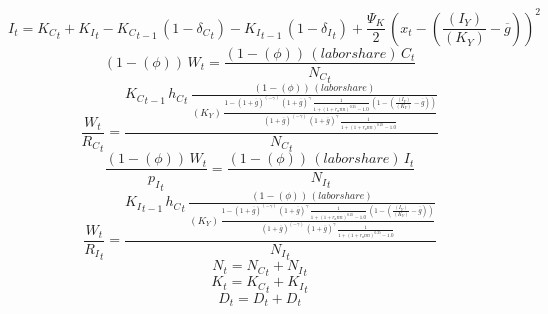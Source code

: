 \begin{dmath}
{{I}}_{t}={{K_C}}_{t}+{{K_I}}_{t}-{{K_C}}_{t-1}\, \left(1-{{\delta_C}}_{t}\right)-{{K_I}}_{t-1}\, \left(1-{{\delta_I}}_{t}\right)+\frac{{{\Psi_K}}}{2}\, \left({{x}}_{t}-\left(\frac{{(I_Y)}}{{(K_Y)}}-{{\overline{g}}}\right)\right)^{2}
\end{dmath}
\begin{dmath}
\left(1-{(\phi)}\right)\, {{W}}_{t}=\frac{\left(1-{(\phi)}\right)\, {(labor share)}\, {{C}}_{t}}{{{N_C}}_{t}}
\end{dmath}
\begin{dmath}
\frac{{{W}}_{t}}{{{R_C}}_{t}}=\frac{{{K_C}}_{t-1}\, {{h_C}}_{t}\, \frac{\left(1-{(\phi)}\right)\, {(labor share)}}{{(K_Y)}\, \frac{1-\left(1+{{\overline{g}}}\right)^{\left(-{{\gamma}}\right)}\, \left(1+{{\overline{g}}}\right)^{{{\gamma}}}\, \frac{1}{1+\left(1+{{r_ann}}\right)^{0.25}-1.0}\, \left(1-\left(\frac{{(I_Y)}}{{(K_Y)}}-{{\overline{g}}}\right)\right)}{\left(1+{{\overline{g}}}\right)^{\left(-{{\gamma}}\right)}\, \left(1+{{\overline{g}}}\right)^{{{\gamma}}}\, \frac{1}{1+\left(1+{{r_ann}}\right)^{0.25}-1.0}}}}{{{N_C}}_{t}}
\end{dmath}
\begin{dmath}
\frac{\left(1-{(\phi)}\right)\, {{W}}_{t}}{{{p_I}}_{t}}=\frac{\left(1-{(\phi)}\right)\, {(labor share)}\, {{I}}_{t}}{{{N_I}}_{t}}
\end{dmath}
\begin{dmath}
\frac{{{W}}_{t}}{{{R_I}}_{t}}=\frac{{{K_I}}_{t-1}\, {{h_C}}_{t}\, \frac{\left(1-{(\phi)}\right)\, {(labor share)}}{{(K_Y)}\, \frac{1-\left(1+{{\overline{g}}}\right)^{\left(-{{\gamma}}\right)}\, \left(1+{{\overline{g}}}\right)^{{{\gamma}}}\, \frac{1}{1+\left(1+{{r_ann}}\right)^{0.25}-1.0}\, \left(1-\left(\frac{{(I_Y)}}{{(K_Y)}}-{{\overline{g}}}\right)\right)}{\left(1+{{\overline{g}}}\right)^{\left(-{{\gamma}}\right)}\, \left(1+{{\overline{g}}}\right)^{{{\gamma}}}\, \frac{1}{1+\left(1+{{r_ann}}\right)^{0.25}-1.0}}}}{{{N_I}}_{t}}
\end{dmath}
\begin{dmath}
{{N}}_{t}={{N_C}}_{t}+{{N_I}}_{t}
\end{dmath}
\begin{dmath}
{{K}}_{t}={{K_C}}_{t}+{{K_I}}_{t}
\end{dmath}
\begin{dmath}
{{D}}_{t}={{D}}_{t}+{{D}}_{t}
\end{dmath}
